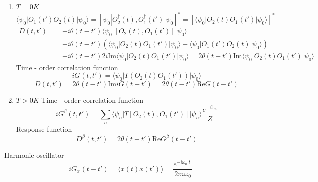 \documentclass[a4paper,11pt]{article}
\begin{document}
\begin{enumerate}
  \item $T=0K$
\begin{equation*}
  \langle\psi_0|O_1(t')O_2(t)|\psi_0\rangle=\left[\psi_0|O_2^\dag(t),O_1^\dag(t')|\psi_0\right]^*=\left[\langle\psi_0|O_2(t)O_1(t')|\psi_0\rangle\right]^*
\end{equation*}
\begin{equation*}
  \begin{split}
     D(t,t')&=-i\theta(t-t')\langle\psi_0|[O_2(t),O_1(t')]|\psi_0\rangle\\
       &=-i\theta(t-t')\left(\langle\psi_0|O_2(t)O_1(t')|\psi_0\rangle-\langle\psi_0|O_1(t')O_2(t)|\psi_0\rangle\right)\\
       &=-i\theta(t-t')2i\mathrm{Im}\langle\psi_0|O_2(t)O_1(t')|\psi_0\rangle=2\theta(t-t')\mathrm{Im}\langle\psi_0|O_2(t)O_1(t')|\psi_0\rangle
  \end{split}
\end{equation*}
Time - order correlation function
\begin{equation*}
  iG(t,t')=\langle\psi_0|T(O_2(t)O_1(t'))|\psi_0\rangle
\end{equation*}
\begin{equation*}
  D(t,t')=2\theta(t-t')\mathrm{Im}iG(t-t')=2\theta(t-t')\mathrm{Re}G(t-t')
\end{equation*}
  \item $T>0K$
  Time - order correlation function
  \begin{equation*}
    iG^\beta(t,t')=\sum_{n}\langle\psi_n|T[O_2(t),O_1(t')]|\psi_n\rangle\frac{e^{-\beta\epsilon_n}}{Z}
  \end{equation*}
  Response function
  \begin{equation*}
    D^{\beta}(t,t')=2\theta(t-t')\mathrm{Re}G^\beta(t-t')
  \end{equation*}
\end{enumerate}
Harmonic oscillator
\begin{equation*}
  iG_x(t-t')=\langle x(t)x(t')\rangle=\frac{e^{-i\omega_0|t|}}{2m\omega_0}
\end{equation*}
\end{document}
